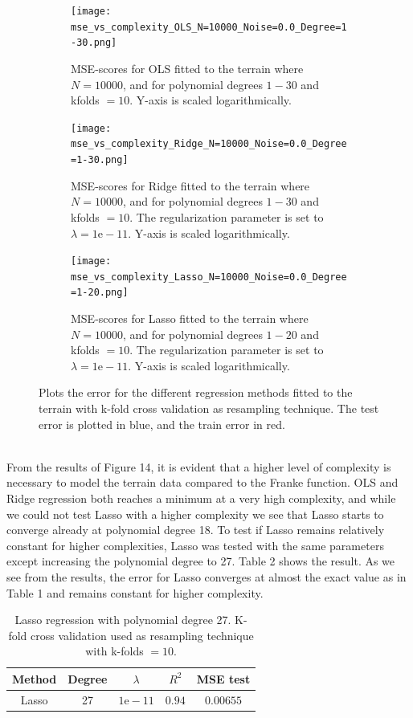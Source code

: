 \documentclass[a4paper,twocolumn]{article}
\begin{document}
\begin{figure}[H]
    \centering
    \begin{subfigure}[b]{0.9\columnwidth}
        \texttt{[image: mse\_vs\_complexity\_OLS\_N=10000\_Noise=0.0\_Degree=1-30.png]}
        \caption{MSE-scores for OLS fitted to the terrain where $N = 10000$, and for polynomial degrees $1- 30$ and kfolds $= 10$. Y-axis is scaled logarithmically.}
    \end{subfigure}
    
    \begin{subfigure}[b]{0.9\columnwidth}
        \texttt{[image: mse\_vs\_complexity\_Ridge\_N=10000\_Noise=0.0\_Degree=1-30.png]}
        \caption{MSE-scores for Ridge fitted to the terrain where $N = 10000$, and for polynomial degrees $1- 30$ and kfolds $= 10$. The regularization parameter is set to $\lambda = 1\textrm{e}-11$. Y-axis is scaled logarithmically.}
    \end{subfigure}
    
    \begin{subfigure}[b]{0.9\columnwidth}
        \texttt{[image: mse\_vs\_complexity\_Lasso\_N=10000\_Noise=0.0\_Degree=1-20.png]}
        \caption{MSE-scores for Lasso fitted to the terrain where $N = 10000$, and for polynomial degrees $1- 20$ and kfolds $= 10$. The regularization parameter is set to $\lambda = 1\textrm{e}-11$. Y-axis is scaled logarithmically.}
    \end{subfigure}
    \caption{Plots the error for the different regression methods fitted to the terrain with k-fold cross validation as resampling technique. The test error is plotted in blue, and the train error in red.}
\end{figure}\\
\noindent From the results of Figure 14, it is evident that a higher level of complexity is necessary to model the terrain data compared to the Franke function. OLS and Ridge regression both reaches a minimum at a very high complexity, and while we could not test Lasso with a higher complexity we see that Lasso starts to converge already at polynomial degree 18. To test if Lasso remains relatively constant for higher complexities, Lasso was tested with the same parameters except increasing the polynomial degree to 27. Table 2 shows the result. As we see from the results, the error for Lasso converges at almost the exact value as in Table 1 and remains constant for higher complexity.
\begin{table}[h]
    \centering
    \caption{Lasso regression with polynomial degree 27. K-fold cross validation used as resampling technique with k-folds $= 10$.}
    \begin{tabular}{|c||c|c|c|c| }
    \hline
        Method & Degree & $\lambda$ & $R^{2}$ & MSE test \\ 
        \hline\hline
        Lasso & 27 & $1\textrm{e}-11$ & $0.94$ & $0.00655$\\
        \hline
    \end{tabular}
\end{table}\\
\end{document}
